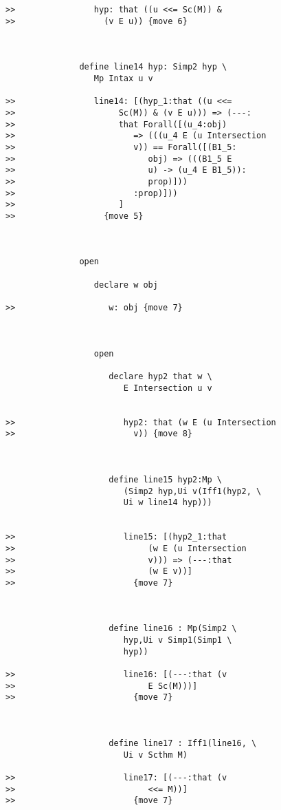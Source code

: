 \documentclass[12pt]{article}
\begin{document}
\begin{verbatim}
>>                hyp: that ((u <<= Sc(M)) &
>>                  (v E u)) {move 6}



               define line14 hyp: Simp2 hyp \
                  Mp Intax u v

>>                line14: [(hyp_1:that ((u <<=
>>                     Sc(M)) & (v E u))) => (---:
>>                     that Forall([(u_4:obj)
>>                        => (((u_4 E (u Intersection
>>                        v)) == Forall([(B1_5:
>>                           obj) => (((B1_5 E
>>                           u) -> (u_4 E B1_5)):
>>                           prop)]))
>>                        :prop)]))
>>                     ]
>>                  {move 5}



               open

                  declare w obj

>>                   w: obj {move 7}



                  open

                     declare hyp2 that w \
                        E Intersection u v


>>                      hyp2: that (w E (u Intersection
>>                        v)) {move 8}



                     define line15 hyp2:Mp \
                        (Simp2 hyp,Ui v(Iff1(hyp2, \
                        Ui w line14 hyp)))


>>                      line15: [(hyp2_1:that
>>                           (w E (u Intersection
>>                           v))) => (---:that
>>                           (w E v))]
>>                        {move 7}



                     define line16 : Mp(Simp2 \
                        hyp,Ui v Simp1(Simp1 \
                        hyp))

>>                      line16: [(---:that (v
>>                           E Sc(M)))]
>>                        {move 7}



                     define line17 : Iff1(line16, \
                        Ui v Scthm M)

>>                      line17: [(---:that (v
>>                           <<= M))]
>>                        {move 7}




\end{verbatim}
\end{document}
